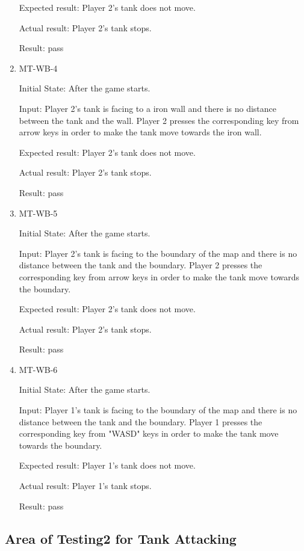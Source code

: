 \documentclass[12pt, titlepage]{article}
\begin{document}
\begin{enumerate}
Expected result: Player 2's tank does not move.
					
Actual result: Player 2's tank stops.

Result: pass

\item{MT-WB-4\\}
					
Initial State: After the game starts.
					
Input: Player 2's tank is facing to a iron wall and there is no distance between the tank and the wall. Player 2 presses the corresponding key from arrow keys in order to make the tank move towards the iron wall.
					
Expected result: Player 2's tank does not move.
					
Actual result: Player 2's tank stops.

Result: pass

\item{MT-WB-5\\}
					
Initial State: After the game starts.
					
Input: Player 2's tank is facing to the boundary of the map and there is no distance between the tank and the boundary. Player 2 presses the corresponding key from arrow keys in order to make the tank move towards the boundary.
					
Expected result: Player 2's tank does not move.
					
Actual result: Player 2's tank stops.

Result: pass

\item{MT-WB-6\\}
					
Initial State: After the game starts.
					
Input: Player 1's tank is facing to the boundary of the map and there is no distance between the tank and the boundary. Player 1 presses the corresponding key from "WASD" keys in order to make the tank move towards the boundary.
					
Expected result: Player 1's tank does not move.
					
Actual result: Player 1's tank stops.

Result: pass

\end{enumerate}

\subsection{Area of Testing2 for Tank Attacking}
\end{document}
